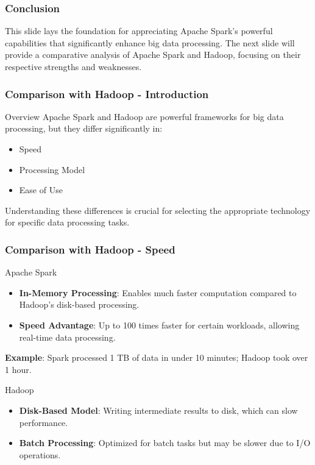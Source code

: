 \documentclass{beamer}
\begin{document}
\begin{frame}
    \frametitle{Conclusion}
    This slide lays the foundation for appreciating Apache Spark's powerful capabilities that significantly enhance big data processing. 
    The next slide will provide a comparative analysis of Apache Spark and Hadoop, focusing on their respective strengths and weaknesses.
\end{frame}

\begin{frame}[fragile]
    \frametitle{Comparison with Hadoop - Introduction}
    \begin{block}{Overview}
        Apache Spark and Hadoop are powerful frameworks for big data processing, but they differ significantly in:
        \begin{itemize}
            \item Speed
            \item Processing Model
            \item Ease of Use
        \end{itemize}
        Understanding these differences is crucial for selecting the appropriate technology for specific data processing tasks.
    \end{block}
\end{frame}

\begin{frame}[fragile]
    \frametitle{Comparison with Hadoop - Speed}
    \begin{block}{Apache Spark}
        \begin{itemize}
            \item \textbf{In-Memory Processing}: Enables much faster computation compared to Hadoop's disk-based processing.
            \item \textbf{Speed Advantage}: Up to 100 times faster for certain workloads, allowing real-time data processing.
        \end{itemize}
        \textbf{Example}: Spark processed 1 TB of data in under 10 minutes; Hadoop took over 1 hour.
    \end{block}
    
    \begin{block}{Hadoop}
        \begin{itemize}
            \item \textbf{Disk-Based Model}: Writing intermediate results to disk, which can slow performance.
            \item \textbf{Batch Processing}: Optimized for batch tasks but may be slower due to I/O operations.
        \end{itemize}
    \end{block}
\end{frame}
\end{document}
